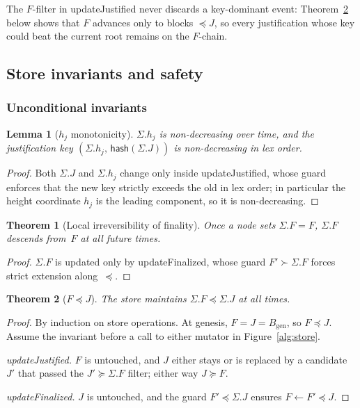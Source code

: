 \documentclass{article}
\newcommand{\genesis}{\ensuremath{B_{\mathrm{gen}}}}
\newcommand{\hash}{\mathsf{hash}}
\newcommand{\updateJustified}{\textsf{updateJustified}\xspace}
\newcommand{\updateFinalized}{\textsf{updateFinalized}\xspace}
\theoremstyle{plain}
\newtheorem{theorem}{Theorem}
\newtheorem{lemma}{Lemma}
\theoremstyle{definition}
\theoremstyle{remark}
\begin{document}
The $F$-filter in \updateJustified never discards a key-dominant event: Theorem~\ref{thm:fleqr} below shows that $F$ advances only to blocks $\preceq J$, so every justification whose key could beat the current root remains on the $F$-chain.

\subsection{Store invariants and safety}

\subsubsection*{Unconditional invariants}

\begin{lemma}[$h_j$ monotonicity]\label{lem:Rs-key-monotone}
$\Sigma.h_j$ is non-decreasing over time, and the justification key $(\Sigma.h_j,\, \hash(\Sigma.J))$ is non-decreasing in lex order.
\end{lemma}

\begin{proof}
Both $\Sigma.J$ and $\Sigma.h_j$ change only inside \updateJustified, whose guard enforces that the new key strictly exceeds the old in lex order; in particular the height coordinate $h_j$ is the leading component, so it is non-decreasing.
\end{proof}

\begin{theorem}[Local irreversibility of finality]\label{thm:finperm}
Once a node sets $\Sigma.F = F$, $\Sigma.F$ descends from~$F$ at all future times.
\end{theorem}

\begin{proof}
$\Sigma.F$ is updated only by \updateFinalized, whose guard $F' \succ \Sigma.F$ forces strict extension along~$\preceq$.
\end{proof}

\begin{theorem}[$F \preceq J$]\label{thm:fleqr}
The store maintains $\Sigma.F \preceq \Sigma.J$ at all times.
\end{theorem}

\begin{proof}
By induction on store operations.
At genesis, $F = J = \genesis$, so $F \preceq J$.
Assume the invariant before a call to either mutator in Figure~\ref{alg:store}.

\emph{\updateJustified.}
$F$ is untouched, and $J$ either stays or is replaced by a candidate~$J'$ that passed the $J' \succeq \Sigma.F$ filter; either way $J \succeq F$.

\emph{\updateFinalized.}
$J$ is untouched, and the guard $F' \preceq \Sigma.J$ ensures $F \gets F' \preceq J$.
\end{proof}
\end{document}
